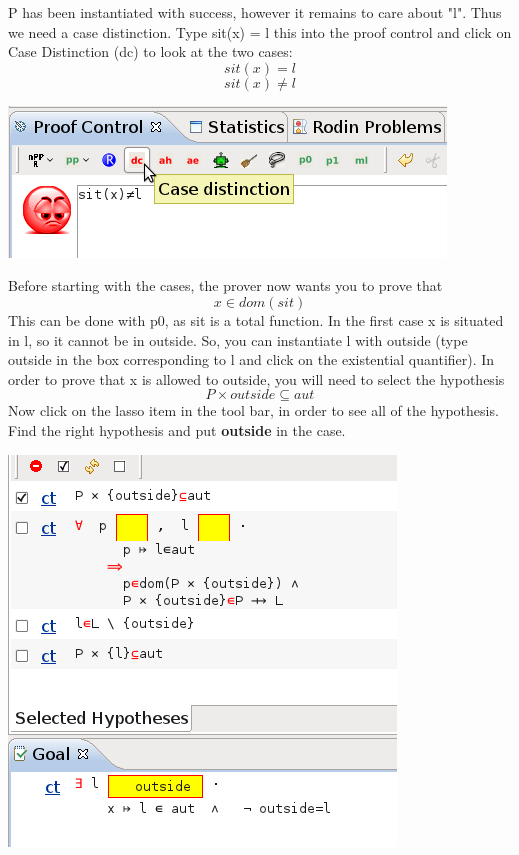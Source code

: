 P has been instantiated with success, however it remains to care about "l". Thus we need a case distinction.
Type sit(x) = l this into the proof control and click on Case Distinction (dc) to look at the two cases:
\[
sit(x)=l 
\]
\[
sit(x) \neq l
\]
\begin{center}
	\includegraphics[]{img/tutorial/tut_10_case_distinction.png}
\end{center}

Before starting with the cases, the prover now wants you to prove that 
\[
 x \in dom(sit)
\]
This can be done with p0, as sit is a total function. In the first case x is situated in l, so it cannot be in outside. So, you can instantiate l with outside (type outside in the box corresponding to l and click on the existential quantifier). In order to prove that x is allowed to outside, you will need to select the hypothesis
\[
P \times outside \subseteq aut
\]
Now click on the lasso item in the tool bar, in order to see all of the hypothesis. Find the right hypothesis and put \textbf{outside} in the case.
\begin{center}
	\includegraphics[]{img/tutorial/tut_10_outside.png}
\end{center}

